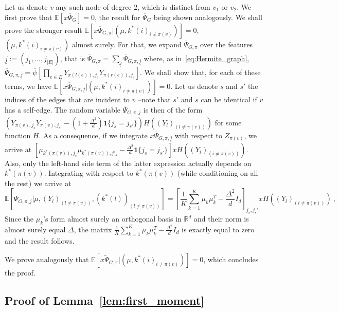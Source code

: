 \documentclass{article}
\begin{document}
Let us denote $v$ any such node of degree $2$, which is distinct from $v_1$ or $v_2$. We first prove that  $\mathbb{E}[x\overline{\Psi}_{G}]=0$, the result for $\overline{\Psi}_{G}$ being shown analogously. 
We shall prove the stronger result $\mathbb{E}[x\overline{\Psi}_{G,\pi}|(\mu, k^*(i)_{i\neq \pi(v)}) ]=0$,   $(\mu, k^*(i)_{i\neq \pi(v)})$ almost surely. For that, we expand $\overline{\Psi}_{G,\pi}$ over the features $\underline{j}:= (j_1,\ldots, j_{|E|})$, that is $\overline{\Psi}_{G,\pi}= \sum_{\underline{j}}
\overline{\Psi}_{G,\pi,\underline{j}}$ where, as in~\eqref{eq:Hermite_graph}, $\overline{\Psi}_{G,\pi,\underline{j}}= \overline{\psi}\left[\prod_{e\in E} Y_{\pi(l(e)),j_e}Y_{\pi(r(e)),j_e}\right]$. We shall show that, for   each of these terms, we have  $\mathbb{E}\left[x\overline{\Psi}_{G,\pi,\underline{j}}|(\mu, k^*(i)_{i\neq \pi(v)})\right]=0$. Let us denote $s$ and $s'$ the indices of the edges that are incident to $v$ --note that $s'$ and $s$ can be identical if $v$ has a self-edge. The random variable $\overline{\Psi}_{G,\pi,\underline{j}}$ is then of the form $(Y_{\pi(v),j_{s}}Y_{\pi(v),j_{s'}}- (1+\frac{\Delta^2}{d})\mathbf{1}\{j_{s}=j_{s'}\}) H((Y_l)_{(l\neq \pi(v))})$ for some function $H$. As a consequence, if we integrate $x\overline{\Psi}_{G,\pi,\underline{j}}$ with respect to $Z_{\pi(v)}$, we arrive at $[\mu_{k^*(\pi(v)),j_s}\mu_{k^*(\pi(v)),j'_s}- \frac{\Delta^2}{d}\mathbf{1}\{j_{s}=j_{s'}\}]xH((Y_i)_{(i\neq \pi(v))})$. Also, only the left-hand side term of the latter expression actually depends on $k^*(\pi(v))$. Integrating with respect to $k^{*}(\pi(v))$ (while conditioning on all the rest) we arrive at 
\[
\mathbb{E}\left[\overline{\Psi}_{G,\pi,\underline{j}}|\mu, (Y_l)_{(l\neq \pi(v))},(k^*(l))_{(l\neq \pi(v))} \right] = \left[\frac{1}{K}\sum_{k=1}^K \mu_k \mu_k^T - \frac{\Delta^2}{d} I_d\right]_{j_{s},j_{s}'}x H((Y_l)_{(l\neq \pi(v))}) \ , 
\]
Since the $\mu_k$'s form almost surely an orthogonal basis in $\mathbb{R}^d$ and their norm is almost surely equal $\Delta$, the matrix $\frac{1}{K}\sum_{k=1}^K \mu_k \mu_k^T - \frac{\Delta^2}{d} I_d$ is exactly equal to zero and the result follows.%

We prove analogously that $\mathbb{E}[x\widetilde{\Psi}_{G,\pi}|(\mu, k^*(i)_{i\neq \pi(v)}) ]=0$, which concludes the proof. 

\subsection{Proof of Lemma~\ref{lem:first_moment}}
\end{document}

